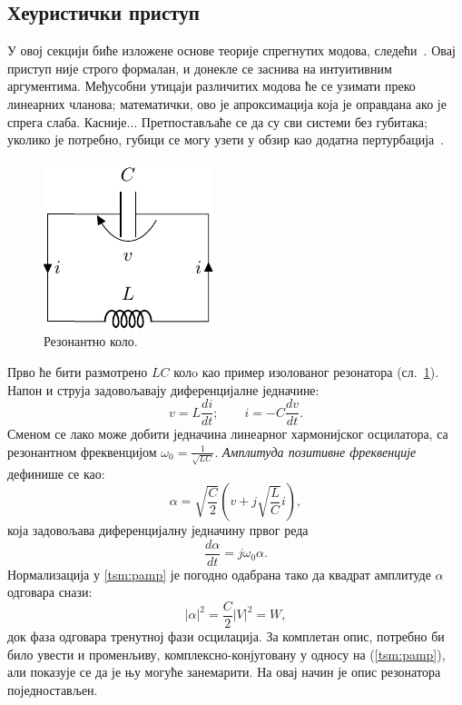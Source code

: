 \documentclass[main.tex]{subfiles}
\begin{document}
\subsection{Хеуристички приступ}

У овој секцији биће изложене основе теорије спрегнутих модова, следећи~\cite{haus}. Овај приступ није строго формалан, и донекле се заснива на интуитивним аргументима. Међусобни утицаји различитих модова ће се узимати преко линеарних чланова; математички, ово је апроксимација која је оправдана ако је спрега слаба. Касније... Претпостављаће се да су сви системи без губитака; уколико је потребно, губици се могу узети у обзир као додатна пертурбација~\cite{haus}.

\begin{figure}[h]
\centering
\includegraphics[width=0.4\linewidth]{sl_tsm/lckolo.pdf}
\caption{Резонантно коло.}
\label{tsm:fig:lckolo}
\end{figure}
Прво ће бити размотрено $LC$ колo као пример изолованог резонатора (сл.~\ref{tsm:fig:lckolo}). Напон и струја задовољавају диференцијалне једначине:
\begin{equation}
v = L \frac{d i}{d t}; \qquad i = -C \frac{d v}{d t}.
\end{equation}
Сменом се лако може добити једначина линеарног хармонијског осцилатора, са резонантном фреквенцијом $\omega_0 = \frac{1}{\sqrt{LC}}$. \emph{Амплитуда позитивне фреквенције} дефинише се као:
\begin{equation}
\alpha = \sqrt{\frac{C}{2}}\left( v + j\sqrt{\frac{L}{C}}i  \right),
\label{tsm:pamp}
\end{equation}
која задовољава диференцијалну једначину првог реда
\begin{equation}
\frac{d\alpha}{dt} = j\omega_0 \alpha.
\label{tsm:smdif1}
\end{equation}
Нормализација у \ref{tsm:pamp} је погодно одабрана тако да квадрат амплитуде $\alpha$ одговара снази:
\begin{equation}
|\alpha|^2 = \frac{C}{2}|V|^2 = W,
\end{equation}
док фаза одговара тренутној фази осцилација. За комплетан опис, потребно би било увести и променљиву, комплексно-конјуговану у односу на (\ref{tsm:pamp}), али показује се да је њу могуће занемарити. На овај начин је опис резонатора поједностављен.
\end{document}
